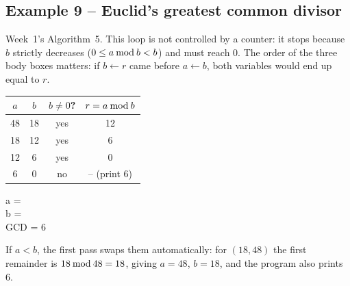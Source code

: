 \documentclass[11pt,a4paper]{article}
\begin{document}
\subsection{Example 9 -- Euclid's greatest common divisor}
Week~1's Algorithm~5. This loop is not controlled by a counter: it stops because $b$ strictly decreases ($0 \le a \mathbin{\mathrm{mod}} b < b$) and must reach $0$. The order of the three body boxes matters: if $b \gets r$ came before $a \gets b$, both variables would end up equal to $r$.
\begin{center}
\begin{minipage}[c]{0.44\linewidth}\centering
{}
\end{minipage}\hfill
\begin{minipage}[c]{0.52\linewidth}\centering\small
\begin{tabular}{cccc}
\toprule
$a$ & $b$ & $b \ne 0$? & $r = a \mathbin{\mathrm{mod}} b$\\ \midrule
48 & 18 & yes & 12\\
18 & 12 & yes & 6\\
12 & 6 & yes & 0\\
6 & 0 & \textcolor{errc}{no} & -- \quad(print 6)\\ \bottomrule
\end{tabular}
\begin{consolebox}
a = \\ b = \\ GCD = 6
\end{consolebox}
\end{minipage}
\end{center}
If $a < b$, the first pass swaps them automatically: for $(18, 48)$ the first remainder is $18 \mathbin{\mathrm{mod}} 48 = 18$, giving $a=48$, $b=18$, and the program also prints $6$.
\end{document}
